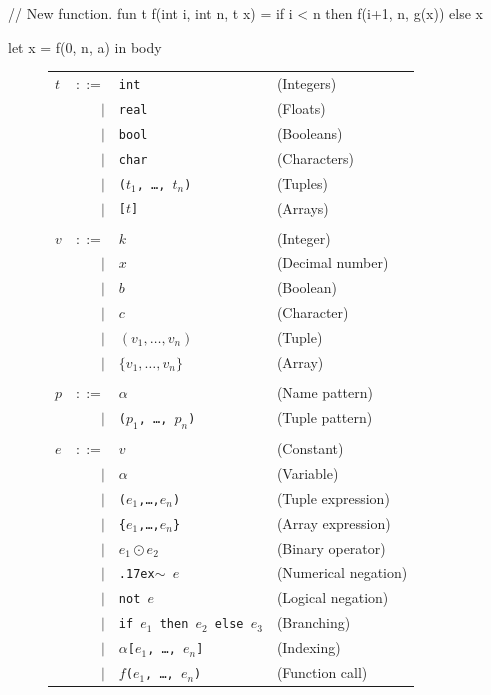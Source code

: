 \documentclass{sigplanconf}  %
\renewcommand\tilde[0]{{\raise.17ex\hbox{$\scriptstyle\sim$}}}
\begin{document}
\begin{colorcode}
// New function.
fun t f(int i, int n, t x) =
  if i < n then f(i+1, n, g(x)) else x

let x = f(0, n, a)
in body
\end{colorcode}

\begin{figure}[bt]
\begin{tabular}{lrll}
$t$ & $::=$ & {\tt int} & (Integers) \\
& $|$ & {\tt real} & (Floats) \\
& $|$ & {\tt bool} & (Booleans) \\
& $|$ & {\tt char} & (Characters) \\
& $|$ & {\tt ($t_{1}$, \ldots, $t_{n}$)} & (Tuples) \\
& $|$ & {\tt [$t$]} & (Arrays) \\
\\
$v$ & $::=$ & $k$ & (Integer)\\
& $|$ & $x$ & (Decimal number) \\
& $|$ & $b$ & (Boolean)\\
& $|$ & $c$ & (Character)\\
& $|$ & $(v_{1},\ldots,v_{n})$ & (Tuple) \\
& $|$ & $\{v_{1},\ldots,v_{n}\}$ & (Array) \\
\\
$p$ & $::=$ & $\alpha$ & (Name pattern)\\
& $|$ & {\tt ($p_{1}$, \ldots, $p_{n}$)} & (Tuple pattern) \\
\\
$e$ & $::=$ & $v$ & (Constant)\\
& $|$ & $\alpha$ & (Variable)\\
& $|$ & {\tt ($e_{1}$,\ldots,$e_{n}$)} & (Tuple expression) \\
& $|$ & {\tt \{$e_{1}$,\ldots,$e_{n}$\}} & (Array expression) \\
& $|$ & $e_{1} \odot{} e_{2}$ & (Binary operator) \\
& $|$ & {\tt \tilde{} $e$} & (Numerical negation) \\
& $|$ & {\tt not $e$} & (Logical negation) \\
& $|$ & {\tt if $e_{1}$ then $e_{2}$ else $e_{3}$} & (Branching) \\
& $|$ & {\tt $\alpha$[$e_{1}$, \ldots, $e_{n}$]} & (Indexing) \\
& $|$ & {\tt $f$($e_{1}$, \ldots, $e_{n}$)} & (Function call) \\

\end{tabular}
\end{figure}
\end{document}

